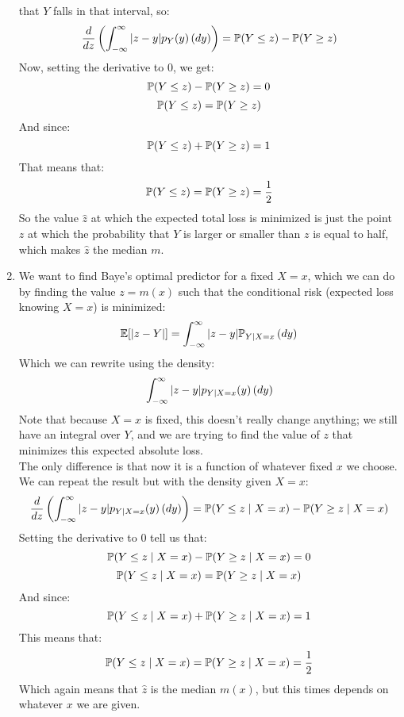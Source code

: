 \documentclass[12pt]{article}
\begin{document}
\begin{enumerate}[label = \letters]
that $Y$ falls in that interval, so:
\[ \dfrac{d}{dz}\left( \int_{-\infty}^{\infty} |z - y|p_Y(y) \, (dy)  \right) = 
\mathbb{P}(Y \leq z) - \mathbb{P}(Y \geq z) \]
Now, setting the derivative to $0$,
we get:
\[ \mathbb{P}(Y \leq z) - \mathbb{P}(Y \geq z) = 0 \]
\[ \mathbb{P}(Y \leq z) = \mathbb{P}(Y \geq z) \]
And since:
\[ \mathbb{P}(Y \leq z) + \mathbb{P}(Y \geq z) = 1 \]
That means that:
\[ \mathbb{P}(Y \leq z) = \mathbb{P}(Y \geq z) = \dfrac{1}{2} \]
So the value $\hat{z}$
at which the expected total loss is minimized
is just the point $z$
at which the probability that $Y$
is larger or smaller than $z$ is equal to half,
which makes $\hat{z}$ the median $m$.
\item
We want to find Baye's optimal predictor
for a fixed $X = x$,
which we can do by finding the value $z = m(x)$
such that the conditional risk 
(expected loss knowing $X = x$) is minimized:
\[ \mathbb{E}[|z - Y|] 
= \int_{-\infty}^{\infty} |z - y|\mathbb{P}_{Y \mid X = x} \, (dy) \]
Which we can rewrite using the density:
\[ \int_{-\infty}^{\infty} |z - y|p_{Y | X = x}(y) \, (dy) \]
Note that because $X = x$ is fixed,
this doesn't really change anything;
we still have an integral over $Y$,
and we are trying to find the value of $z$
that minimizes this expected absolute loss. \\
The only difference is that now it
is a function of whatever fixed $x$
we choose. \\
We can repeat the result but with the
density given $X = x$:
\[ \dfrac{d}{dz}\left( \int_{-\infty}^{\infty} |z - y|p_{Y | X = x}(y) \, (dy)  \right) = 
\mathbb{P}(Y \leq z \mid X = x) - \mathbb{P}(Y \geq z \mid X = x) \]
Setting the derivative to $0$ tell us that:
\[ \mathbb{P}(Y \leq z \mid X = x) 
- \mathbb{P}(Y \geq z \mid X = x) = 0 \]
\[ \mathbb{P}(Y \leq z \mid X = x) 
= \mathbb{P}(Y \geq z \mid X = x) \]
And since:
\[ \mathbb{P}(Y \leq z \mid X = x) 
+ \mathbb{P}(Y \geq z \mid X = x) = 1 \]
This means that:
\[ \mathbb{P}(Y \leq z \mid X = x) 
= \mathbb{P}(Y \geq z \mid X = x) = \dfrac{1}{2} \]
Which again means that $\hat{z}$
is the median $m(x)$, but this times
depends on whatever $x$ we are given. \\
\end{enumerate}

\newpage

\end{document}
